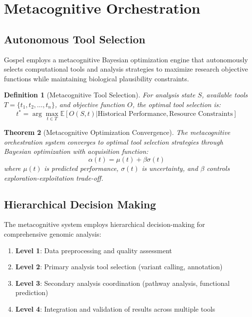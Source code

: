 \documentclass[12pt,a4paper]{article}
\newtheorem{theorem}{Theorem}[section]
\newtheorem{definition}[theorem]{Definition}
\begin{document}
\section{Metacognitive Orchestration}

\subsection{Autonomous Tool Selection}

Gospel employs a metacognitive Bayesian optimization engine that autonomously selects computational tools and analysis strategies to maximize research objective functions while maintaining biological plausibility constraints.

\begin{definition}[Metacognitive Tool Selection]
For analysis state $S$, available tools $T = \{t_1, t_2, \ldots, t_n\}$, and objective function $O$, the optimal tool selection is:
\begin{equation}
t^* = \arg\max_{t \in T} \mathbb{E}[O(S, t) | \text{Historical Performance}, \text{Resource Constraints}]
\end{equation}
\end{definition}

\begin{theorem}[Metacognitive Optimization Convergence]
The metacognitive orchestration system converges to optimal tool selection strategies through Bayesian optimization with acquisition function:
\begin{equation}
\alpha(t) = \mu(t) + \beta \sigma(t)
\end{equation}
where $\mu(t)$ is predicted performance, $\sigma(t)$ is uncertainty, and $\beta$ controls exploration-exploitation trade-off.
\end{theorem}

\subsection{Hierarchical Decision Making}

The metacognitive system employs hierarchical decision-making for comprehensive genomic analysis:

\begin{enumerate}
\item \textbf{Level 1}: Data preprocessing and quality assessment
\item \textbf{Level 2}: Primary analysis tool selection (variant calling, annotation)
\item \textbf{Level 3}: Secondary analysis coordination (pathway analysis, functional prediction)
\item \textbf{Level 4}: Integration and validation of results across multiple tools
\end{enumerate}
\end{document}
